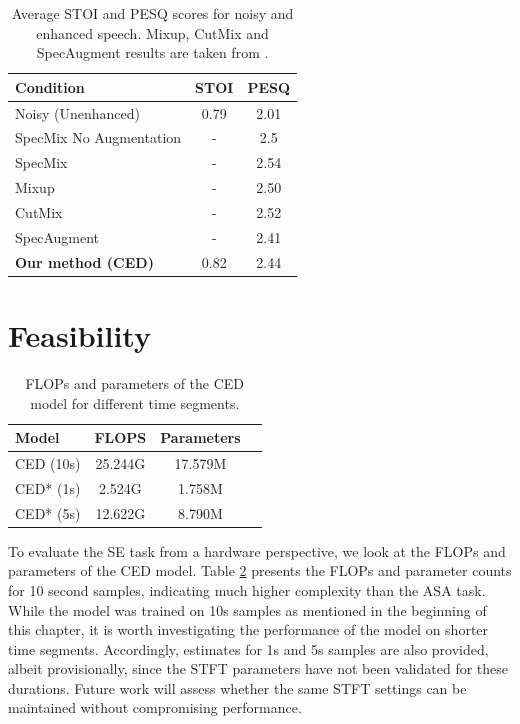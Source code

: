 \documentclass[logo,bsc,singlespacing,parskip,online]{infthesis}
\begin{document}
\begin{table}[h]
   \centering
   \begin{tabular}{l|cc}                                                                               
   \toprule
   Condition & STOI & PESQ \\
   \midrule
   Noisy (Unenhanced) & 0.79 & 2.01 \\   
   SpecMix No Augmentation \citep{kim_specmix_2021} & - & 2.5 \\
   SpecMix \citep{kim_specmix_2021} & - & 2.54 \\
   Mixup \citep{zhang_mixup_2017} & - & 2.50 \\
   CutMix \citep{yun_cutmix_2019} & - & 2.52 \\
   SpecAugment \citep{park_specaugment_2019} & - & 2.41 \\
   \textbf{Our method (CED)} & 0.82 & 2.44 \\
   \bottomrule
   \end{tabular}
   \caption{Average STOI and PESQ scores for noisy and enhanced speech. Mixup, CutMix and SpecAugment results are taken 
   from \citet{kim_specmix_2021}.}
   \label{tab:voice_enhancement_metrics}
\end{table} 
\section{Feasibility}
\begin{table}[h]
   \centering
   \begin{tabular}{lccc}
      \toprule
      Model & FLOPS & Parameters \\
      \midrule
      CED (10s) & 25.244G & 17.579M \\
      CED* (1s) & 2.524G & 1.758M \\
      CED* (5s) & 12.622G & 8.790M \\
      \bottomrule
   \end{tabular}
   \caption{FLOPs and parameters of the CED model for different time segments.}
   \label{tab:ced-model-metrics}
\end{table}
To evaluate the SE task from a hardware perspective, we look at the FLOPs and parameters of the CED model.
Table \ref{tab:ced-model-metrics} presents the FLOPs and parameter counts for 10 second samples, 
indicating much higher complexity than the ASA task. While the model was trained on 10s samples 
as mentioned in the beginning of this chapter, it is worth investigating the performance of the model 
on shorter time segments. Accordingly, estimates for 1s and 5s samples are also provided, albeit 
provisionally, since the STFT parameters have not been validated for these durations. Future work 
will assess whether the same STFT settings can be maintained without compromising performance.
\end{document}

